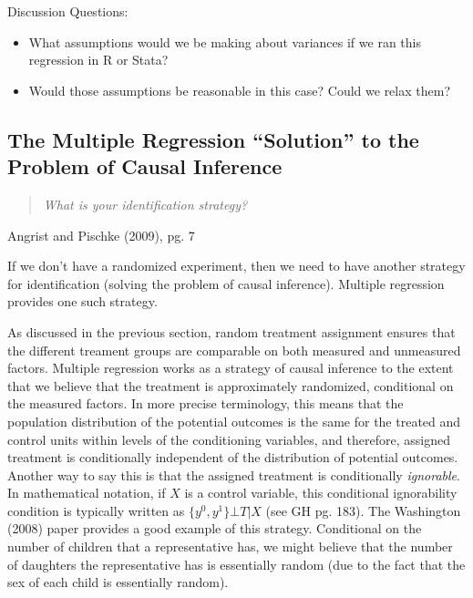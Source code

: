 \documentclass{article}
\begin{document}
\noindent Discussion Questions: 
\single
\begin{itemize}
\item What assumptions would we be making about variances if we ran this regression in R or Stata? 
\item Would those assumptions be reasonable in this case? Could we relax them?
\end{itemize}
\double

\subsection{The Multiple Regression ``Solution'' to the Problem of Causal Inference}

\begin{quote}
{\it What is your identification strategy?}
\end{quote}
\begin{center}
Angrist and Pischke (2009), pg. 7
\end{center}

If we don't have a randomized experiment, then we need to have another strategy for identification (solving the problem of causal inference). Multiple regression provides one such strategy.


As discussed in the previous section, random treatment assignment ensures that the different treament groups are comparable on both measured and unmeasured factors. Multiple regression works as a strategy of causal inference to the extent that we believe that the treatment is approximately randomized, conditional on the measured factors. In more precise terminology, this means that the population distribution of the potential outcomes is the same for the treated and control units within levels of the conditioning variables, and therefore, assigned treatment is conditionally independent of the distribution of potential outcomes. Another way to say this is that the assigned treatment is conditionally \emph{ignorable}. In mathematical notation, if $X$ is a control variable, this conditional ignorability condition is typically written as $\{y^0,y^1\} \bot T|X$ (see GH pg. 183). The Washington (2008) paper provides a good example of this strategy. Conditional on the number of children that a representative has, we might believe that the number of daughters the representative has is essentially random (due to the fact that the sex of each child is essentially random).  
\end{document}
